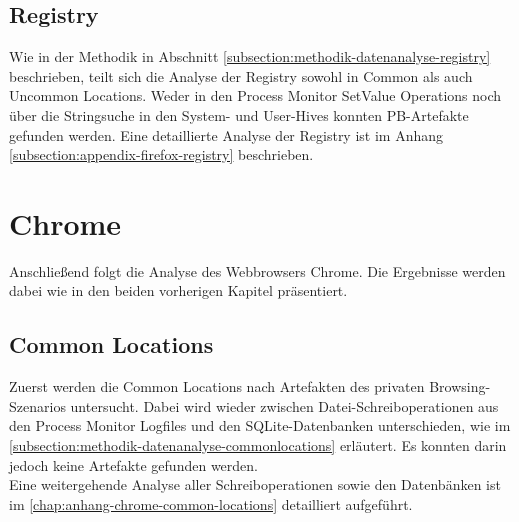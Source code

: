 \subsection*{Registry}
Wie in der Methodik in Abschnitt \ref{subsection:methodik-datenanalyse-registry} beschrieben, teilt sich die Analyse der Registry sowohl in Common als auch Uncommon Locations. Weder in den Process Monitor \grqq{}SetValue\grqq{} Operations noch über die Stringsuche in den System- und User-Hives konnten PB-Artefakte gefunden werden. Eine detaillierte Analyse der Registry ist im Anhang \ref{subsection:appendix-firefox-registry} beschrieben. 

\pagebreak

\section{Chrome}\label{chap:ergebnisse-chrome}

Anschließend folgt die Analyse des Webbrowsers Chrome. Die Ergebnisse werden dabei wie in den beiden vorherigen Kapitel präsentiert.

\subsection*{Common Locations}\label{chap:ergebnisse-chrome-common-location}

Zuerst werden die Common Locations nach Artefakten des privaten Browsing-Szenarios untersucht. Dabei wird wieder zwischen Datei-Schreiboperationen aus den Process Monitor Logfiles und den SQLite-Datenbanken unterschieden, wie im \autoref{subsection:methodik-datenanalyse-commonlocations} erläutert. Es konnten darin jedoch keine Artefakte gefunden werden.\\
Eine weitergehende Analyse aller Schreiboperationen sowie den Datenbänken ist im \autoref{chap:anhang-chrome-common-locations} detailliert aufgeführt.

